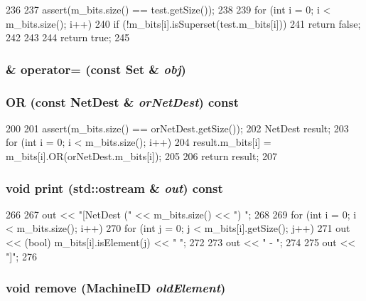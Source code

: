 \begin{DoxyCode}
236 {
237     assert(m_bits.size() == test.getSize());
238 
239     for (int i = 0; i < m_bits.size(); i++) {
240         if (!m_bits[i].isSuperset(test.m_bits[i])) {
241             return false;
242         }
243     }
244     return true;
245 }
\end{DoxyCode}
\hypertarget{classNetDest_a25dd337795dbd5ae36a4c7f5f1f45f8d}{
\subsubsection[{operator=}]{\& operator= (const {\bf Set} \& {\em obj})}}
\label{classNetDest_a25dd337795dbd5ae36a4c7f5f1f45f8d}
\hypertarget{classNetDest_aadbbe10effe51d7a2d176c22332d0848}{
\subsubsection[{OR}]{ OR (const {\bf NetDest} \& {\em orNetDest}) const}}
\label{classNetDest_aadbbe10effe51d7a2d176c22332d0848}



\begin{DoxyCode}
200 {
201     assert(m_bits.size() == orNetDest.getSize());
202     NetDest result;
203     for (int i = 0; i < m_bits.size(); i++) {
204         result.m_bits[i] = m_bits[i].OR(orNetDest.m_bits[i]);
205     }
206     return result;
207 }
\end{DoxyCode}
\hypertarget{classNetDest_ac55fe386a101fbae38c716067c9966a0}{
\subsubsection[{print}]{\setlength{\rightskip}{0pt plus 5cm}void print (std::ostream \& {\em out}) const}}
\label{classNetDest_ac55fe386a101fbae38c716067c9966a0}



\begin{DoxyCode}
266 {
267     out << "[NetDest (" << m_bits.size() << ") ";
268 
269     for (int i = 0; i < m_bits.size(); i++) {
270         for (int j = 0; j < m_bits[i].getSize(); j++) {
271             out << (bool) m_bits[i].isElement(j) << " ";
272         }
273         out << " - ";
274     }
275     out << "]";
276 }
\end{DoxyCode}
\hypertarget{classNetDest_a716c5d07d7bdfb2be2a8882083362ae3}{
\subsubsection[{remove}]{\setlength{\rightskip}{0pt plus 5cm}void remove ({\bf MachineID} {\em oldElement})}}
\label{classNetDest_a716c5d07d7bdfb2be2a8882083362ae3}



